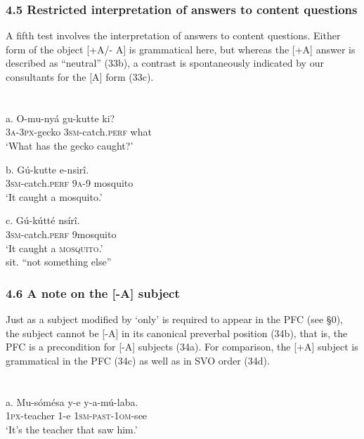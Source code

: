 \documentclass[output=paper]{langsci/langscibook}
\begin{document}
\subsection{ 4.5 Restricted interpretation of answers to content questions}

A fifth test involves the interpretation of answers to content questions. Either form of the object [+A/- A] is grammatical here, but whereas the [+A] answer is described as “neutral” (33b), a contrast is spontaneously indicated by our consultants for the [A] form (33c). 

\chapter[]{}
\gll   a.  O-mu-nyá    gu-kutte    ki?\\
         \textsc{3a}{}-\textsc{3px}{}-gecko  \textsc{3sm}{}-catch.\textsc{perf}  what\\
\glt     ‘What has the gecko caught?’
\z

\gll   b.  Gú-kutte    e-nsirî.\\
         \textsc{3sm}{}-catch.\textsc{perf}  \textsc{9a}{}-9 mosquito\\
\glt     ‘It caught a mosquito.’
\z

\gll   c.  Gú-kútté    nsírî.\\
         \textsc{3sm}{}-catch.\textsc{perf}  9mosquito\\
\glt ‘It caught a \textsc{mosquito}.’\\
sit. “not something else”
\z

\subsection{ 4.6 A note on the [-A] subject}

Just as a subject modified by ‘only’ is required to appear in the PFC (see §0), the subject cannot be [-A] in its canonical preverbal position (34b), that is, the PFC is a precondition for [-A] subjects (34a). For comparison, the [+A] subject is grammatical in the PFC (34c) as well as in SVO order (34d).

\chapter[]{}
\gll   a.  Mu-sómésa  y-e  y-a-mú-laba.\\
         \textsc{1px}{}-teacher  1-e  \textsc{1sm}{}-\textsc{past}{}-\textsc{1om}{}-see\\
\glt     ‘It’s the teacher that saw him.’
\z
\end{document}
